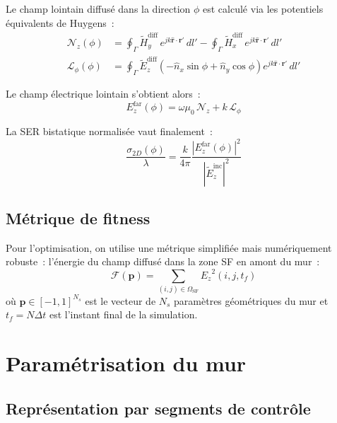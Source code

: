\documentclass[12pt,a4paper]{article}
\newcommand{\dt}{\Delta t}
\numberwithin{equation}{section}
\numberwithin{figure}{section}
\numberwithin{table}{section}
\begin{document}
Le champ lointain diffusé dans la direction $\phi$ est calculé via les
potentiels équivalents de Huygens~:
\begin{align}
    \mathcal{N}_z(\phi) &=
    \oint_\Gamma \tilde{H}_y^{\text{diff}}\,e^{jk\bm{\hat{r}}\cdot\bm{r}'}\,dl'
    - \oint_\Gamma \tilde{H}_x^{\text{diff}}\,e^{jk\bm{\hat{r}}\cdot\bm{r}'}\,dl'
    \label{eq:Nz} \\
    \mathcal{L}_\phi(\phi) &=
    \oint_\Gamma \tilde{E}_z^{\text{diff}}
    \left(-\hat{n}_x\sin\phi + \hat{n}_y\cos\phi\right)
    e^{jk\bm{\hat{r}}\cdot\bm{r}'}\,dl'
    \label{eq:Lphi}
\end{align}

Le champ électrique lointain s'obtient alors~:
\begin{equation}
    E_z^{\text{far}}(\phi) = \omega\mu_0\,\mathcal{N}_z + k\,\mathcal{L}_\phi
    \label{eq:Ez_far}
\end{equation}

La SER bistatique normalisée vaut finalement~:
\begin{equation}
    \frac{\sigma_{2D}(\phi)}{\lambda} = \frac{k}{4\pi}
    \frac{\left|E_z^{\text{far}}(\phi)\right|^2}
         {\left|\tilde{E}_z^{\text{inc}}\right|^2}
    \label{eq:bistatic_SER}
\end{equation}

\subsection{Métrique de fitness}

Pour l'optimisation, on utilise une métrique simplifiée mais numériquement robuste~:
l'énergie du champ diffusé dans la zone SF en amont du mur~:
\begin{equation}
    \mathcal{F}(\bm{p}) = \sum_{(i,j)\in\Omega_{\text{SF}}} {E_z}^2(i,j,t_f)
    \label{eq:fitness}
\end{equation}
où $\bm{p} \in [-1,1]^{N_s}$ est le vecteur de $N_s$ paramètres géométriques
du mur et $t_f = N\dt$ est l'instant final de la simulation.

\section{Paramétrisation du mur}

\subsection{Représentation par segments de contrôle}
\end{document}
